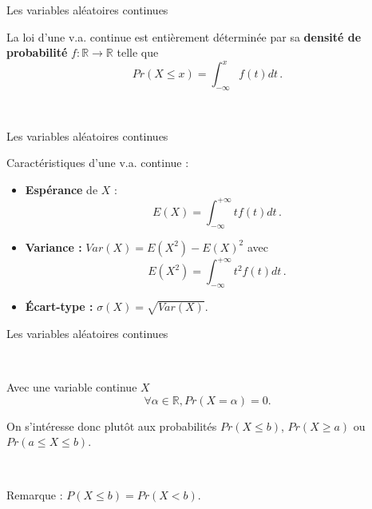 \documentclass{beamer}
\newcommand{\R}{\mathbb{R}}
\begin{document}

\begin{frame}{Les variables aléatoires continues}


La loi d'une v.a. continue est entièrement déterminée par sa {\bf densité de probabilité} $f : \mathbb{R}\longrightarrow \mathbb{R}$ telle que
$$
Pr(X\leq x)=\int_{-\infty}^x f(t) dt\,.
$$
 
\ 




\end{frame}


\begin{frame}{Les variables aléatoires continues}

{\Large Caractéristiques d'une v.a. continue :}


\begin{itemize}
\item {\bf Espérance}  de $X$ :
$$
E(X)=\int_{-\infty}^{+\infty} tf(t) dt\,.
$$

\item {\bf Variance :} $Var(X)=E(X^2)-E(X)^2$ avec $$E(X^2)=\int_{-\infty}^{+\infty} t^2f(t) dt\,.$$

\item {\bf Écart-type :} $\sigma(X)=\sqrt{Var(X)}$.

\end{itemize}

\end{frame}


\begin{frame}{Les variables aléatoires continues}

\

\noindent {\bf \textcolor{red}{ Important :}} Avec une variable continue $X$ $$\forall \alpha\in \R, Pr(X=\alpha)=0.$$


On s'intéresse donc  plutôt aux probabilités $Pr(X\leq b)$, $Pr(X\geq a)$ ou $Pr(a\leq X\leq b)$. 

\

Remarque :  $P(X\leq b) =Pr(X<b)$.\\

\end{frame}

\end{document}
